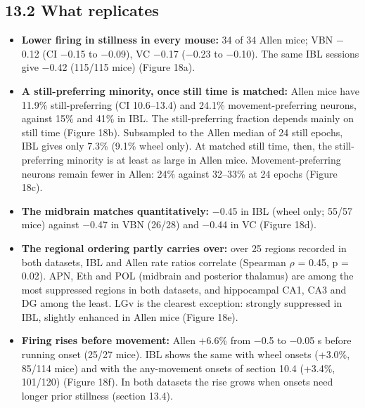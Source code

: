 \documentclass[10pt,a4paper]{article}
\begin{document}
\subsection{13.2 What replicates}
\begin{itemize}
\item \textbf{Lower firing in stillness in every mouse:} 34 of 34 Allen mice; VBN $-$0.12 (CI $-$0.15 to $-$0.09), VC $-$0.17 ($-$0.23 to $-$0.10). The same IBL sessions give $-$0.42 (115/115 mice) (Figure 18a).
\item \textbf{A still-preferring minority, once still time is matched:} Allen mice have 11.9\% still-preferring (CI 10.6--13.4) and 24.1\% movement-preferring neurons, against 15\% and 41\% in IBL. The still-preferring fraction depends mainly on still time (Figure 18b). Subsampled to the Allen median of 24 still epochs, IBL gives only 7.3\% (9.1\% wheel only). At matched still time, then, the still-preferring minority is at least as large in Allen mice. Movement-preferring neurons remain fewer in Allen: 24\% against 32--33\% at 24 epochs (Figure 18c).
\item \textbf{The midbrain matches quantitatively:} $-$0.45 in IBL (wheel only; 55/57 mice) against $-$0.47 in VBN (26/28) and $-$0.44 in VC (Figure 18d).
\item \textbf{The regional ordering partly carries over:} over 25 regions recorded in both datasets, IBL and Allen rate ratios correlate (Spearman $\rho$ = 0.45, p = 0.02). APN, Eth and POL (midbrain and posterior thalamus) are among the most suppressed regions in both datasets, and hippocampal CA1, CA3 and DG among the least. LGv is the clearest exception: strongly suppressed in IBL, slightly enhanced in Allen mice (Figure 18e).
\item \textbf{Firing rises before movement:} Allen +6.6\% from $-$0.5 to $-$0.05 s before running onset (25/27 mice). IBL shows the same with wheel onsets (+3.0\%, 85/114 mice) and with the any-movement onsets of section 10.4 (+3.4\%, 101/120) (Figure 18f). In both datasets the rise grows when onsets need longer prior stillness (section 13.4).
\end{itemize}
\end{document}
